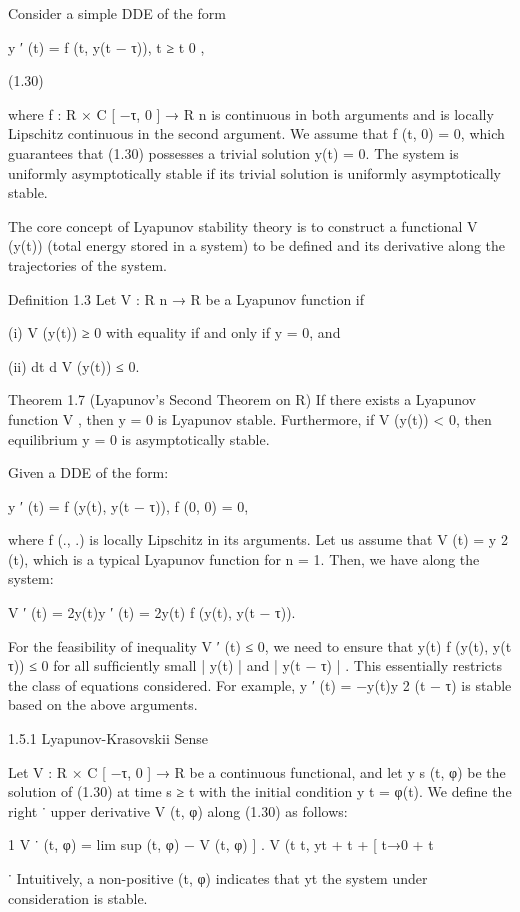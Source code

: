 \documentclass[12pt]{article}
\begin{document}
Consider a simple DDE of the form

y ′ (t) = f (t, y(t − τ)), t ≥ t 0 ,

(1.30)

where f : R × C [ −τ, 0 ] → R n is continuous in both arguments and is locally Lipschitz continuous in the second argument. We assume that 
f (t, 0) = 0, which guarantees that (1.30) possesses a trivial solution y(t) = 0. The system is uniformly asymptotically stable if its 
trivial solution is uniformly asymptotically stable.

The core concept of Lyapunov stability theory is to construct a functional V (y(t)) (total energy stored in a system) to be deﬁned and its 
derivative along the trajectories of the system.

Deﬁnition 1.3 Let V : R n → R be a Lyapunov function if

(i) V (y(t)) ≥ 0 with equality if and only if y = 0, and

(ii) dt d V (y(t)) ≤ 0.

Theorem 1.7 (Lyapunov’s Second Theorem on R) If there exists a Lyapunov function V , then y = 0 is Lyapunov stable. Furthermore, if V (y(t)) 
< 0, then equilibrium y = 0 is asymptotically stable.

Given a DDE of the form:

y ′ (t) = f (y(t), y(t − τ)), f (0, 0) = 0,

where f (., .) is locally Lipschitz in its arguments. Let us assume that V (t) = y 2 (t), which is a typical Lyapunov function for n = 1. 
Then, we have along the system:

V ′ (t) = 2y(t)y ′ (t) = 2y(t) f (y(t), y(t − τ)).

For the feasibility of inequality V ′ (t) ≤ 0, we need to ensure that y(t) f (y(t), y(t τ)) ≤ 0 for all sufﬁciently small | y(t) | and | 
y(t − τ) | . This essentially restricts the class of equations considered. For example, y ′ (t) = −y(t)y 2 (t − τ) is stable based on the 
above arguments.

1.5.1 Lyapunov-Krasovskii Sense

Let V : R × C [ −τ, 0 ] → R be a continuous functional, and let y s (t, φ) be the solution of (1.30) at time s ≥ t with the initial 
condition y t = φ(t). We deﬁne the right ˙ upper derivative V (t, φ) along (1.30) as follows:

1 V ˙ (t, φ) = lim sup (t, φ) − V (t, φ) ] . V (t t, yt + t  + [ t→0 + t

˙ Intuitively, a non-positive (t, φ) indicates that yt  the system under consideration is stable.
\end{document}
